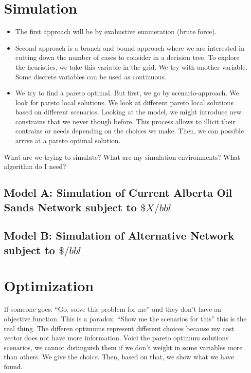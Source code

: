 \documentclass[12pt]{article}
\begin{document}
\section{Simulation}
\begin{itemize}
\item The first approach will be by exahustive enumeration (brute force). 
\item Second approach is a branch and bound approach where we are interested in cutting down the number of cases to consider in a decision tree. To explore the heuristics, we take this variable in the grid. We try with another variable. Some discrete variables can be used as continuous. 
\item We try to find a pareto optimal. But first, we go by scenario-approach. We look for pareto local solutions. We look at different pareto local solutions based on different scenarios. Looking at the model, we might introduce new constrains that we never though before. This process allows to illicit their contrains or needs depending on the choices we make. Then, we can possible arrive at a pareto optimal solution. 
\end{itemize}

What are we trying to simulate? What are my simulation environments? What algorithm do I need?

\subsection{Model A: Simulation of Current Alberta Oil Sands Network subject to $\$X/bbl$}
\subsection{Model B: Simulation of Alternative Network subject to $\$/bbl$}


\section{Optimization}
If someone goes: ``Go, solve this problem for me'' and they don't have an objective function. This is a paradox. ``Show me the scenarios for this'' this is the real thing. The differen optimums represent different choices because my cost vector does not have more information. Voici the pareto optimum solutions scenarios, we cannot distinguish them if we don't weight in some variables more than others. We give the choice. Then, based on that, we show what we have found. 
\end{document}

